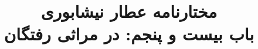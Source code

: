 \documentclass[14pt,b5paper]{article}
\begin{document}
\title{\Huge مختارنامه عطار نیشابوری \\
باب بیست و پنجم: در مراثی رفتگان}
\author{ }
\date{ }
\maketitle
\newpage
\tableofcontents
\newpage

\newpage

\newpage

\newpage

\newpage

\newpage

\newpage

\newpage

\newpage

\newpage

\newpage

\newpage

\newpage

\newpage

\newpage

\newpage

\newpage

\newpage

\newpage

\newpage

\newpage

\newpage

\newpage

\newpage

\newpage

\newpage

\newpage

\newpage

\newpage

\newpage

\newpage

\newpage

\newpage

\newpage

\newpage

\newpage

\newpage

\newpage

\newpage

\newpage

\newpage

\newpage

\newpage

\newpage

\newpage

\newpage
\end{document}
